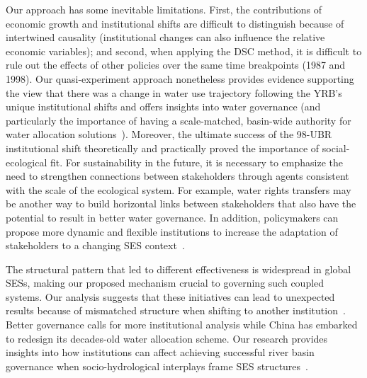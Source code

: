 Our approach has some inevitable limitations.
First, the contributions of economic growth and institutional shifts are difficult to distinguish because of intertwined causality (institutional changes can also influence the relative economic variables);
and second, when applying the DSC method, it is difficult to rule out the effects of other policies over the same time breakpoints (1987 and 1998).
Our quasi-experiment approach nonetheless provides evidence supporting the view that there was a change in water use trajectory following the YRB's unique institutional shifts and offers insights into water governance (and particularly the importance of having a scale-matched, basin-wide authority for water allocation solutions~\cite{bodin2017b, ostrom2009, reyers2018}).
Moreover, the ultimate success of the 98-UBR institutional shift theoretically and practically proved the importance of social-ecological fit.
For sustainability in the future, it is necessary to emphasize the need to strengthen connections between stakeholders through agents consistent with the scale of the ecological system.
For example, water rights transfers may be another way to build horizontal links between stakeholders that also have the potential to result in better water governance.
In addition, policymakers can propose more dynamic and flexible institutions to increase the adaptation of stakeholders to a changing SES context~\cite{reyers2018}.

The structural pattern that led to different effectiveness is widespread in global SESs, making our proposed mechanism crucial to governing such coupled systems.
Our analysis suggests that these initiatives can lead to unexpected results because of mismatched structure when shifting to another institution~\cite{bodin2017b}.
Better governance calls for more institutional analysis while China has embarked to redesign its decades-old water allocation scheme.
Our research provides insights into how institutions can affect achieving successful river basin governance when socio-hydrological interplays frame SES structures~\cite{muneepeerakul2017, leslie2015, hegwood2022}.
